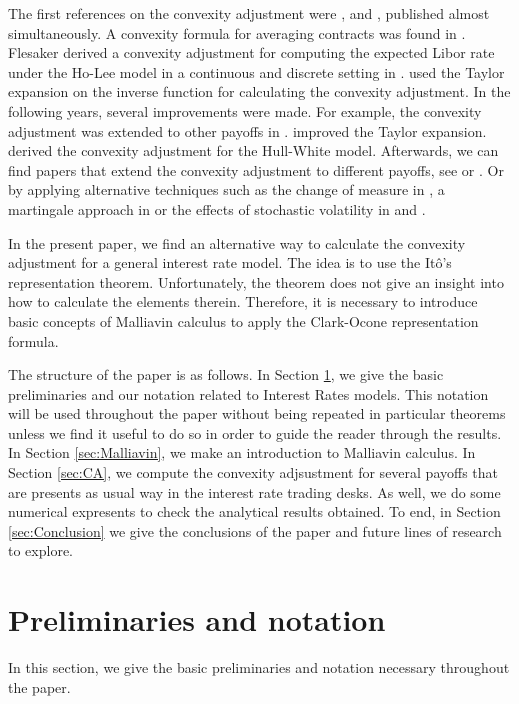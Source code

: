 \documentclass[a4paper,10pt]{article}
\newcommand{\1}{\mathbf{1}}
\begin{document}
The first references on the convexity adjustment were \cite{RitchkenS}, \cite{Flesaker} and \cite{BrothertonIben}, published almost simultaneously. A convexity formula for averaging contracts was found in \cite{RitchkenS}. Flesaker derived a convexity adjustment for computing the expected Libor rate under the Ho-Lee model in a continuous and discrete setting in \cite{Flesaker}. \cite{BrothertonIben} used the Taylor expansion on the inverse function for calculating the convexity adjustment. In the following years, several improvements were made. For example, the convexity adjustment was extended to other payoffs in \cite{Hull06}. \cite{Hart} improved the Taylor expansion. \cite{KirikosNovak} derived the convexity adjustment for the Hull-White model. Afterwards, we can find papers that extend the convexity adjustment to different payoffs, see \cite{Benhamou00WC} or \cite{Hagan03}. Or by applying alternative techniques such as the change of measure in \cite{Pelsser}, a martingale approach in \cite{Benhamou00} or the effects of stochastic volatility in \cite{PiterbargRenedo} and \cite{HaganWoodward20}.

In the present paper, we find an alternative way to calculate the convexity adjustment for a general interest rate model. The idea is to use the It\^o's representation theorem. Unfortunately, the theorem does not give an insight into how to calculate the elements therein. Therefore, it is necessary to introduce basic concepts of Malliavin calculus to apply the Clark-Ocone representation formula.

The structure of the paper is as follows. In Section \ref{sec:Notation}, we give the basic preliminaries and our notation related to Interest Rates models. This notation will be used throughout the paper without being repeated in particular theorems unless we find it useful to do so in order to guide the reader through the results. In Section \ref{sec:Malliavin}, we make an introduction to Malliavin calculus. In Section \ref{sec:CA}, we compute the convexity adjsustment for several payoffs that are presents as usual way in the interest rate trading desks. As well, we do some numerical expresents to check the analytical results obtained. To end, in Section \ref{sec:Conclusion} we give the conclusions of the paper and future lines of research to explore.


\section{Preliminaries and notation}\label{sec:Notation}
In this section, we give the basic preliminaries and notation necessary throughout the paper.
\end{document}

